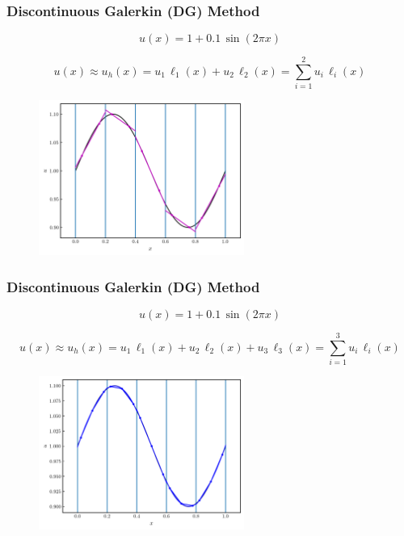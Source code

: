 \documentclass{beamer}
\begin{document}
\begin{frame}
\frametitle{Discontinuous Galerkin (DG) Method}

  \Fontvi

  \begin{equation*}
    u\left(x\right)=1+0.1\,\sin\left(2\pi x\right)
  \end{equation*}

  \begin{equation*}
    u\left(x\right)\approx u_{h}\left(x\right)
    =u_{1}\,\ell_{1}\left(x\right)+u_{2}\,\ell_{2}\left(x\right)
    =\sum\limits_{i=1}^{2}u_{i}\,\ell_{i}\left(x\right)
  \end{equation*}

  \begin{figure}[htb!]
    \centering
    \includegraphics[width=0.6\textwidth]{fig.sineWithLines_DG1.png}
  \end{figure}

\end{frame}

\begin{frame}
\frametitle{Discontinuous Galerkin (DG) Method}

  \Fontvi

  \begin{equation*}
    u\left(x\right)=1+0.1\,\sin\left(2\pi x\right)
  \end{equation*}

  \begin{equation*}
    u\left(x\right)\approx u_{h}\left(x\right)
    =u_{1}\,\ell_{1}\left(x\right)+u_{2}\,\ell_{2}\left(x\right)
    +u_{3}\,\ell_{3}\left(x\right)
    =\sum\limits_{i=1}^{3}u_{i}\,\ell_{i}\left(x\right)
  \end{equation*}

  \begin{figure}[htb!]
    \centering
    \includegraphics[width=0.6\textwidth]{fig.sineWithLines_DG2.png}
  \end{figure}

\end{frame}
\end{document}
